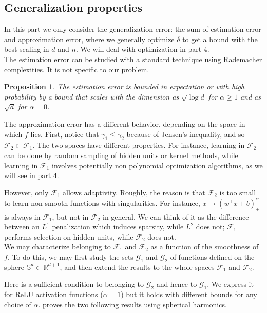 \documentclass[a4paper, 11pt]{scrartcl}
\newtheorem{proposition}{Proposition}[section]
\begin{document}
\subsection{Generalization properties}

In this part we only consider the generalization error: the sum of estimation error and approximation error, where we generally optimize $\delta$ to get a bound with the best scaling in $d$ and $n$. We will deal with optimization in part 4.\\

The estimation error can be studied with a standard technique using Rademacher complexities. It is not specific to our problem.

\begin{proposition}
The estimation error is bounded in expectation or with high probability by a bound that scales with the dimension as $\sqrt{\log d}$ for $\alpha \geq 1$ and as $\sqrt{d}$ for $\alpha = 0$.
\end{proposition}

The approximation error has a different behavior, depending on the space in which $f$ lies. First, notice that $\gamma_1 \leq \gamma_2$ because of Jensen's inequality, and so $\mathcal{F}_2 \subset \mathcal{F}_1$. The two spaces have different properties. For instance, learning in $\mathcal{F}_2$ can be done by random sampling of hidden units or kernel methods, while learning in $\mathcal{F}_1$ involves potentially non polynomial optimization algorithms, as we will see in part 4.

However, only $\mathcal{F}_1$ allows adaptivity. Roughly, the reason is that $\mathcal{F}_2$ is too small to learn non-smooth functions with singularities. For instance, $x\mapsto (w^\top x+b)^\alpha_+$ is always in $\mathcal{F}_1$, but not in $\mathcal{F}_2$ in general. We can think of it as the difference between an $L^1$ penalization which induces sparsity, while $L^2$ does not; $\mathcal{F}_1$ performs selection on hidden units, while $\mathcal{F}_2$ does not.\\


We may characterize belonging to $\mathcal{F}_1$ and $\mathcal{F}_2$ as a function of the smoothness of $f$. To do this, we may first study the sets $\mathcal{G}_1$ and $\mathcal{G}_2$ of functions defined on the sphere $\mathbb{S}^d \subset \mathbb{R}^{d+1}$, and then extend the results to the whole spaces $\mathcal{F}_1$ and $\mathcal{F}_2$.

Here is a sufficient condition to belonging to $\mathcal{G}_2$ and hence to $\mathcal{G}_1$. We express it for ReLU activation functions ($\alpha=1$) but it holds with different bounds for any choice of $\alpha$. \cite{bach2017breaking} proves the two following results using spherical harmonics.
\end{document}
